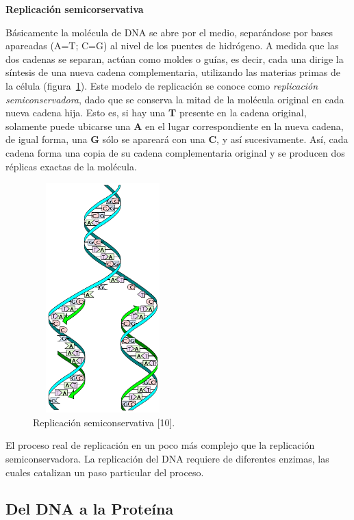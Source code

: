 \vskip 0.5cm
\noindent \textbf{Replicación semicorservativa}
\vskip 0.025cm

Básicamente la molécula de DNA se abre por el medio, separándose por bases apareadas (A=T; C=G) al nivel de los puentes de hidrógeno. A medida que las dos cadenas se separan, actúan como moldes o guías, es decir, cada una dirige la síntesis de una nueva cadena complementaria, utilizando las materias primas de la célula (figura~\ref{semi}).
Este modelo de replicación se conoce como \textit{replicación semiconservadora}, dado que se conserva la mitad de la molécula original en cada nueva cadena hija. Esto es, si hay una \textbf{T} presente en la cadena original, solamente puede ubicarse una \textbf{A} en el lugar correspondiente en la nueva cadena, de igual forma, una \textbf{G} sólo se apareará con una \textbf{C}, y así sucesivamente. Así, cada cadena forma una copia de su cadena complementaria original y se producen dos réplicas exactas de la molécula.

\begin{figure} [h]
		\hspace*{4.5cm}\includegraphics[width=2.1209in,height=3.5000in]{image/replicacionSemiconservativa2.png}
		\caption{Replicación semiconservativa [10].}		
		\label{semi}
\end{figure}				

El proceso real de replicación en un poco más complejo que la replicación semiconservadora. La replicación del DNA requiere de diferentes enzimas, las cuales catalizan un paso particular del proceso. 

\subsection{Del DNA a la Proteína}
